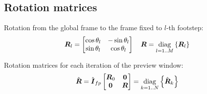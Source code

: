 \documentclass[12pt,a4paper]{article}
\begin{document}

\subsection{Rotation matrices}

Rotation from the global frame to the frame fixed to $l$-th footstep:
\begin{equation*}
    \mbox{\boldmath $R$}_l = 
    \begin{bmatrix}
        \cos{\theta_l}  &   -\sin{\theta_l} \\
        \sin{\theta_l}  &   \cos{\theta_l} \\
    \end{bmatrix}
    \quad
    \mbox{\boldmath $R$} = \underset{l = 1..M}{\operatorname{diag}}\left\{\mbox{\boldmath $R$}_l\right\}
\end{equation*}

Rotation matrices for each iteration of the preview window:
\begin{equation*}
    \hat{\mbox{\boldmath $R$}} = 
    \hat{\mbox{\boldmath $I$}}_{fp} 
    \begin{bmatrix}
        \mbox{\boldmath $R$}_0     &   \mbox{\boldmath $0$}\\
        \mbox{\boldmath $0$}       &   \mbox{\boldmath $R$}\\
    \end{bmatrix}
    = \underset{k = 1..N}{\operatorname{diag}}\left\{\hat{\mbox{\boldmath $R$}}_k\right\}
\end{equation*}



\end{document}
